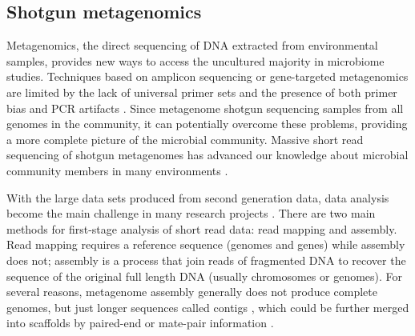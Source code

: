 \documentclass[]{msu-thesis}
\begin{document}
\subsection{Shotgun metagenomics} 
Metagenomics, the direct sequencing of
DNA extracted from environmental samples, provides new ways to access
the uncultured majority in microbiome studies.  Techniques based on
amplicon sequencing or gene-targeted metagenomics are limited by the
lack of universal primer sets and the presence of both primer bias and
PCR artifacts
\cite{frank_critical_2008,haas_chimeric_2011,guo_microbial_2015}. Since
metagenome shotgun sequencing samples from all genomes in the community,
it can potentially overcome these problems, providing a more complete
picture of the microbial community. Massive short read sequencing of
shotgun metagenomes has advanced our knowledge about microbial community
members in many environments
\cite{howe_tackling_2014,sunagawa_ocean_2015}.

With the large data sets produced from second generation data, data
analysis become the main challenge in many research projects
\cite{qin_human_2010,pell_scaling_2012}. There are two main methods for
first-stage analysis of short read data: read mapping and assembly. Read
mapping requires a reference sequence (genomes and genes) while assembly
does not; assembly is a process that join reads of fragmented DNA to
recover the sequence of the original full length DNA (usually
chromosomes or genomes). For several reasons, metagenome assembly
generally does not produce complete genomes, but just longer sequences
called contigs \cite{qin_human_2010,howe_tackling_2014}, which could be
further merged into scaffolds by paired-end or mate-pair information
\cite{zerbino_velvet:_2008}.


\end{document}
